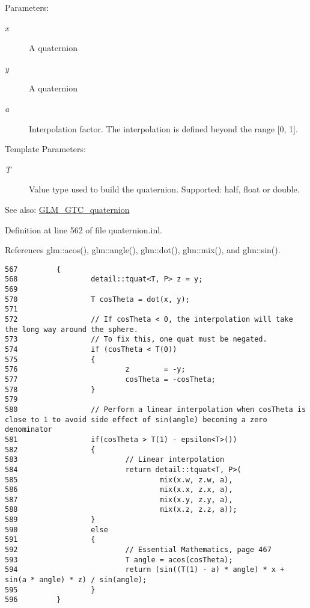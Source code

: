 \begin{Desc}
\item[Parameters:]
\begin{description}
\item[{\em x}]A quaternion \item[{\em y}]A quaternion \item[{\em a}]Interpolation factor. The interpolation is defined beyond the range \mbox{[}0, 1\mbox{]}. \end{description}
\end{Desc}
\begin{Desc}
\item[Template Parameters:]
\begin{description}
\item[{\em T}]Value type used to build the quaternion. Supported: half, float or double. \end{description}
\end{Desc}
\begin{Desc}
\item[See also:]\hyperlink{group__gtc__quaternion}{GLM\_\-GTC\_\-quaternion} \end{Desc}


Definition at line 562 of file quaternion.inl.

References glm::acos(), glm::angle(), glm::dot(), glm::mix(), and glm::sin().

\begin{Code}\begin{verbatim}567         {
568                 detail::tquat<T, P> z = y;
569 
570                 T cosTheta = dot(x, y);
571 
572                 // If cosTheta < 0, the interpolation will take the long way around the sphere. 
573                 // To fix this, one quat must be negated.
574                 if (cosTheta < T(0))
575                 {
576                         z        = -y;
577                         cosTheta = -cosTheta;
578                 }
579 
580                 // Perform a linear interpolation when cosTheta is close to 1 to avoid side effect of sin(angle) becoming a zero denominator
581                 if(cosTheta > T(1) - epsilon<T>())
582                 {
583                         // Linear interpolation
584                         return detail::tquat<T, P>(
585                                 mix(x.w, z.w, a),
586                                 mix(x.x, z.x, a),
587                                 mix(x.y, z.y, a),
588                                 mix(x.z, z.z, a));
589                 }
590                 else
591                 {
592                         // Essential Mathematics, page 467
593                         T angle = acos(cosTheta);
594                         return (sin((T(1) - a) * angle) * x + sin(a * angle) * z) / sin(angle);
595                 }
596         }
\end{verbatim}
\end{Code}





